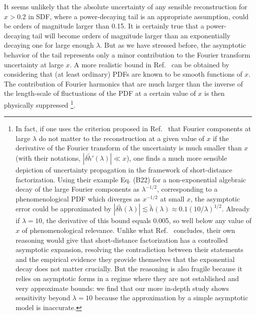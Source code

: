 \documentclass[aps,prl,groupedaddress,twocolumn,superscriptaddress,amsfonts,amssymb,amsmath,showpacs,floatfix,preprintnumbers]{revtex4-2}
\begin{document}
It seems unlikely that the absolute uncertainty of any sensible reconstruction for $x > 0.2$ in SDF, where a power-decaying tail is an appropriate assumption, could be orders of magnitude larger than 0.15. It is certainly true that a power-decaying tail will become orders of magnitude larger than an exponentially decaying one for large enough $\lambda$. But as we have stressed before, the asymptotic behavior of the tail represents only a minor contribution to the Fourier transform uncertainty at large $x$. A more realistic bound in Ref.~\cite{Gao:2021dbh} can be obtained by considering that (at least ordinary) PDFs are known to be smooth functions of $x$. The contribution of Fourier harmonics that are much larger than the inverse of the length-scale of fluctuations of the PDF at a certain value of $x$ is then physically suppressed \footnote{In fact, if one uses the criterion proposed in Ref.~\cite{Gao:2021dbh} that Fourier components at large $\lambda$ do not matter to the reconstruction at a given value of $x$ if the derivative of the Fourier transform of the uncertainty is much smaller than $x$ (with their notations, $|\delta \tilde{h}'(\lambda)| \ll x$), one finds a much more sensible depiction of uncertainty propagation in the framework of short-distance factorization. Using their example Eq. (B22) for a non-exponential algebraic decay of the large Fourier components as $\lambda^{-1/2}$, corresponding to a phenomenological PDF which diverges as $x^{-1/2}$ at small $x$, the asymptotic error could be approximated by $|\delta \tilde h(\lambda)| \lesssim \tilde h(\lambda) \approx 0.1 (10 / \lambda)^{1/2}$. Already if 
$\lambda = 10$, the derivative of this bound equals 0.005, so well below any value of $x$ of phenomenological relevance. Unlike what Ref.~\cite{Gao:2021dbh} concludes, their own reasoning would give that short-distance factorization has a controlled asymptotic expansion, resolving the contradiction between their statements and the empirical evidence they provide themselves that the exponential decay does not matter crucially. But the reasoning is also fragile because it relies on asymptotic forms in a regime where they are not established and very approximate bounds: we find that our more in-depth study shows sensitivity beyond $\lambda = 10$ because the approximation by a simple asymptotic model is inaccurate.}.
\end{document}
